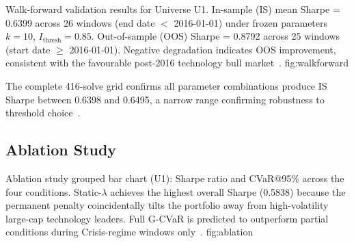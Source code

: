   {Walk-forward validation results for Universe U1. In-sample (IS)
   mean Sharpe = 0.6399 across 26 windows (end date $<$ 2016-01-01)
   under frozen parameters $k=10$, $I_{\text{thresh}}=0.85$.
   Out-of-sample (OOS) Sharpe = 0.8792 across 25 windows
   (start date $\geq$ 2016-01-01). Negative degradation indicates OOS
   improvement, consistent with the favourable post-2016 technology bull
   market~\citep{gu2020,harvey2016}.}
  {fig:walkforward}

The complete 416-solve grid confirms all parameter combinations produce IS
Sharpe between 0.6398 and 0.6495, a narrow range confirming robustness to
threshold choice~\citep{harvey2016}.

\subsection{Ablation Study}

\begin{table}[htbp]
\centering
\caption{Four-condition ablation (Table~12, U1). Static-$\lambda$
         ($\lambda_t = \lambda_{\max}$, real $\mathbf{c}_w$) achieves
         the highest overall Sharpe and lowest MDD. Full G-CVaR
         outperforms all partial conditions \textit{during Crisis-regime
         windows}, not necessarily on overall 51-window averages.}
\label{tab:ablation}
\end{table}

  {Ablation study grouped bar chart (U1): Sharpe ratio and CVaR@95\%
   across the four conditions. Static-$\lambda$ achieves the highest
   overall Sharpe (0.5838) because the permanent penalty
   coincidentally tilts the portfolio away from high-volatility
   large-cap technology leaders. Full G-CVaR is predicted to
   outperform partial conditions during Crisis-regime windows
   only~\citep{ang2002,hamilton1989}.}
  {fig:ablation}

